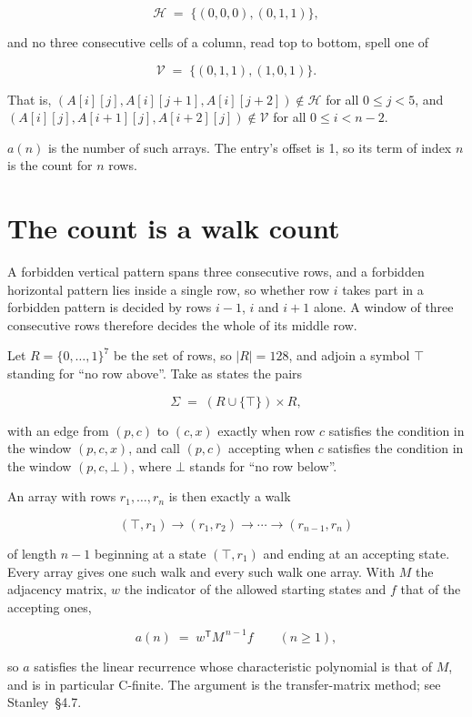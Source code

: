 \documentclass[11pt]{article}
\theoremstyle{definition}
\begin{document}
\[\mathcal{H} \;=\; \{(0,0,0), (0,1,1)\},\]

and no three consecutive cells of a column, read top to bottom, spell one of

\[\mathcal{V} \;=\; \{(0,1,1), (1,0,1)\}.\]

That is, $(A[i][j],A[i][j{+}1],A[i][j{+}2]) \notin \mathcal{H}$ for all $0 \le j < 5$, and $(A[i][j],A[i{+}1][j],A[i{+}2][j]) \notin \mathcal{V}$ for all $0 \le i < n-2$.

$a(n)$ is the number of such arrays. The entry's offset is 1, so its term of index $n$ is the count for $n$ rows.

\section{The count is a walk count}

A forbidden vertical pattern spans three consecutive rows, and a forbidden horizontal pattern lies inside a single row, so whether row $i$ takes part in a forbidden pattern is decided by rows $i-1$, $i$ and $i+1$ alone. A window of three consecutive rows therefore decides the whole of its middle row.

Let $R = \{0,\dots,1\}^{7}$ be the set of rows, so $|R| = 128$, and adjoin a symbol $\top$ standing for ``no row above''. Take as states the pairs

\[\Sigma \;=\; (R \cup \{\top\}) \times R,\]

with an edge from $(p,c)$ to $(c,x)$ exactly when row $c$ satisfies the condition in the window $(p,c,x)$, and call $(p,c)$ accepting when $c$ satisfies the condition in the window $(p,c,\bot)$, where $\bot$ stands for ``no row below''.

An array with rows $r_1,\dots,r_n$ is then exactly a walk

\[(\top,r_1) \to (r_1,r_2) \to \cdots \to (r_{n-1},r_n)\]

of length $n-1$ beginning at a state $(\top,r_1)$ and ending at an accepting state. Every array gives one such walk and every such walk one array. With $M$ the adjacency matrix, $w$ the indicator of the allowed starting states and $f$ that of the accepting ones,

\[a(n) \;=\; w^{\mathsf T} M^{\,n-1} f \qquad (n \ge 1),\]

so $a$ satisfies the linear recurrence whose characteristic polynomial is that of $M$, and is in particular C-finite. The argument is the transfer-matrix method; see Stanley~\S4.7.
\end{document}
